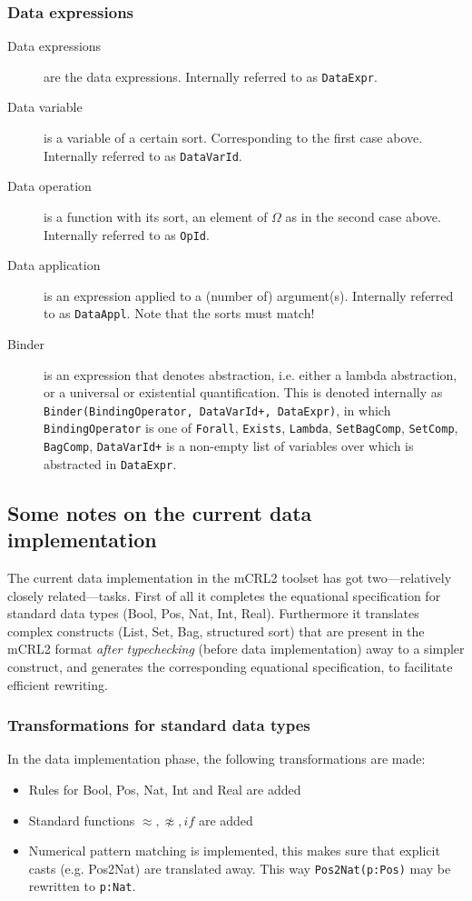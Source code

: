 \documentclass[a4paper,11pt]{article}
\newcommand{\f}[1]{{\mathit{#1}}}
\begin{document}
\subsubsection{Data expressions}
\begin{description}
 \item[Data expressions] are the data expressions. Internally referred to as \texttt{DataExpr}.
 \item[Data variable] is a variable of a certain sort. Corresponding to the first case above. Internally referred to as \texttt{DataVarId}.
 \item[Data operation] is a function with its sort, an element of $\Omega$ as in the second case above. Internally referred to as \texttt{OpId}.
 \item[Data application] is an expression applied to a (number of) argument(s). Internally referred to as \texttt{DataAppl}. Note that the sorts must match!
 \item[Binder] is an expression that denotes abstraction, i.e. either a lambda abstraction, or a universal or existential quantification. This is denoted internally as \texttt{Binder(BindingOperator, DataVarId+, DataExpr)}, in which \texttt{BindingOperator} is one of \texttt{Forall}, \texttt{Exists}, \texttt{Lambda}, \texttt{SetBagComp}, \texttt{SetComp}, \texttt{BagComp}, \texttt{DataVarId+} is a non-empty list of variables over which is abstracted in \texttt{DataExpr}.
\end{description}

\subsection{Some notes on the current data implementation}
The current data implementation in the mCRL2 toolset has got two---relatively closely related---tasks. First of all it completes the equational specification for standard data types (Bool, Pos, Nat, Int, Real). Furthermore it translates complex constructs (List, Set, Bag, structured sort) that are present in the mCRL2 format \emph{after typechecking} (before data implementation) away to a simpler construct, and generates the corresponding equational specification, to facilitate efficient rewriting.

\subsubsection{Transformations for standard data types}
In the data implementation phase, the following transformations are made:
\begin{itemize}
 \item Rules for Bool, Pos, Nat, Int and Real are added
 \item Standard functions $\approx, \not \approx, \f{if}$ are added
 \item Numerical pattern matching is implemented, this makes sure that explicit casts (e.g. Pos2Nat) are translated away. This way \texttt{Pos2Nat(p:Pos)} may be rewritten to \texttt{p:Nat}.
\end{itemize}
\end{document}
